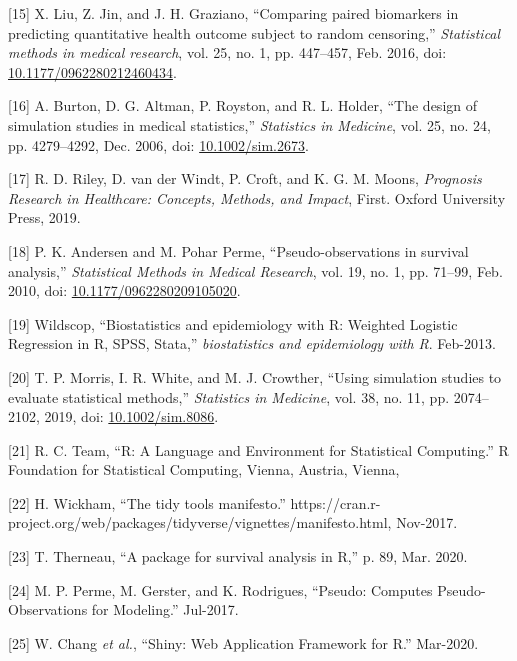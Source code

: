 \documentclass[
]{article}
\newenvironment{cslreferences}%
  {}%
  {\par}
\begin{document}
\begin{cslreferences}
\leavevmode\hypertarget{ref-liu_comparing_2016}{}%
{[}15{]} X. Liu, Z. Jin, and J. H. Graziano, ``Comparing paired biomarkers in predicting quantitative health outcome subject to random censoring,'' \emph{Statistical methods in medical research}, vol. 25, no. 1, pp. 447--457, Feb. 2016, doi: \href{https://doi.org/10.1177/0962280212460434}{10.1177/0962280212460434}.

\leavevmode\hypertarget{ref-burton_design_2006}{}%
{[}16{]} A. Burton, D. G. Altman, P. Royston, and R. L. Holder, ``The design of simulation studies in medical statistics,'' \emph{Statistics in Medicine}, vol. 25, no. 24, pp. 4279--4292, Dec. 2006, doi: \href{https://doi.org/10.1002/sim.2673}{10.1002/sim.2673}.

\leavevmode\hypertarget{ref-riley_prognosis_2019}{}%
{[}17{]} R. D. Riley, D. van der Windt, P. Croft, and K. G. M. Moons, \emph{Prognosis Research in Healthcare: Concepts, Methods, and Impact}, First. Oxford University Press, 2019.

\leavevmode\hypertarget{ref-andersen_pseudo-observations_2010}{}%
{[}18{]} P. K. Andersen and M. Pohar Perme, ``Pseudo-observations in survival analysis,'' \emph{Statistical Methods in Medical Research}, vol. 19, no. 1, pp. 71--99, Feb. 2010, doi: \href{https://doi.org/10.1177/0962280209105020}{10.1177/0962280209105020}.

\leavevmode\hypertarget{ref-wildscop_biostatistics_2013}{}%
{[}19{]} Wildscop, ``Biostatistics and epidemiology with R: Weighted Logistic Regression in R, SPSS, Stata,'' \emph{biostatistics and epidemiology with R}. Feb-2013.

\leavevmode\hypertarget{ref-morris_using_2019}{}%
{[}20{]} T. P. Morris, I. R. White, and M. J. Crowther, ``Using simulation studies to evaluate statistical methods,'' \emph{Statistics in Medicine}, vol. 38, no. 11, pp. 2074--2102, 2019, doi: \href{https://doi.org/10.1002/sim.8086}{10.1002/sim.8086}.

\leavevmode\hypertarget{ref-r_core_team_r_nodate}{}%
{[}21{]} R. C. Team, ``R: A Language and Environment for Statistical Computing.'' R Foundation for Statistical Computing, Vienna, Austria, Vienna,

\leavevmode\hypertarget{ref-wickham_tidy_2017}{}%
{[}22{]} H. Wickham, ``The tidy tools manifesto.'' https://cran.r-project.org/web/packages/tidyverse/vignettes/manifesto.html, Nov-2017.

\leavevmode\hypertarget{ref-therneau_package_2020}{}%
{[}23{]} T. Therneau, ``A package for survival analysis in R,'' p. 89, Mar. 2020.

\leavevmode\hypertarget{ref-perme_pseudo_2017}{}%
{[}24{]} M. P. Perme, M. Gerster, and K. Rodrigues, ``Pseudo: Computes Pseudo-Observations for Modeling.'' Jul-2017.

\leavevmode\hypertarget{ref-chang_shiny_2020}{}%
{[}25{]} W. Chang \emph{et al.}, ``Shiny: Web Application Framework for R.'' Mar-2020.
\end{cslreferences}
\end{document}
